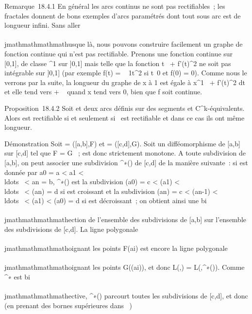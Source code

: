 Remarque~18.4.1 En général les arcs continus ne sont pas rectifiables~;
les fractales donnent de bons exemples d'arcs paramétrés dont tout sous
arc est de longueur infini. Sans aller \\\\jmathmathmathmathusque là, nous pouvons
construire facilement un graphe de fonction continue qui n'est pas
rectifiable. Prenons une fonction continue sur {[}0,1{]}, de classe
^1 sur {]}0,1{]} mais telle que la fonction
t\mapsto~ +
f'(t)^2 ne soit pas intégrable sur {]}0,1{]} (par exemple
f(t) = \sqrttsin~
1\over  t^2 si
t\neq~0 et f(0) = 0). Comme nous le verrons par
la suite, la longueur du graphe de x à 1 est égale à
\int  x^1~
+ f'(t)^2 dt et elle tend vers + \infty~ quand x tend vers 0,
bien que f soit continue.

Proposition~18.4.2 Soit  et  deux arcs définis
sur des segments et C^k-équivalents. Alors  est
rectifiable si et seulement si~ est rectifiable et dans ce
cas ils ont même longueur.

Démonstration Soit  = ({[}a,b{]},F) et  =
({[}c,d{]},G). Soit \theta un difféomorphisme de {[}a,b{]} sur {[}c,d{]} tel
que F = G \cdot \theta~; \theta est donc strictement monotone. A toute subdivision \sigma
de {[}a,b{]}, on peut associer une subdivision \theta^∗(\sigma) de
{[}c,d{]} de la manière suivante~: si \sigma est donnée par a0 = a
\textless{} a1 \textless{}
\\ldots~ \textless{}
an = b, \theta^∗(\sigma) est la subdivision \theta(a0) =
c \textless{} \theta(a1) \textless{}
\\ldots~ \textless{}
\theta(an) = d si \theta est croissant et la subdivision \theta(an)
= c \textless{} \theta(an-1) \textless{}
\\ldots~ \textless{}
\theta(a1) \textless{} \theta(a0) = d si \theta est décroissant~;
on obtient ainsi une bi\\\\jmathmathmathmathection de l'ensemble des subdivisions de
{[}a,b{]} sur l'ensemble des subdivisions de {[}c,d{]}. La ligne
polygonale \\\\jmathmathmathmathoignant les points F(ai) est encore la ligne
polygonale \\\\jmathmathmathmathoignant les points G(\theta(ai)), et donc
L(,\sigma) = L(,\theta^∗(\sigma)). Comme
\theta^∗ est bi\\\\jmathmathmathmathective, \theta^∗(\sigma) parcourt toutes les
subdivisions de {[}c,d{]}, et donc (en prenant des bornes supérieures
dans \overline{}~)

